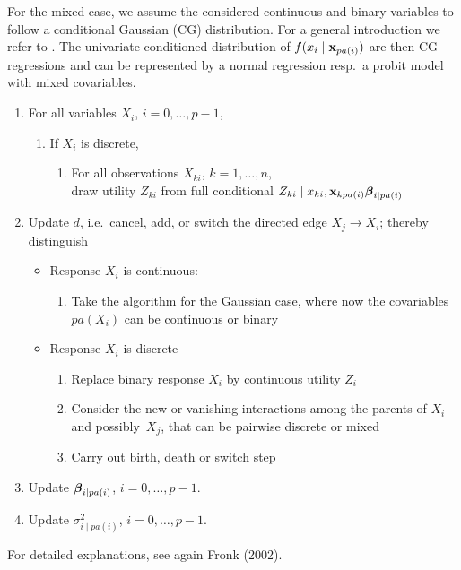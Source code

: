 For the mixed case, we assume the considered continuous and binary
variables to follow a conditional Gaussian (CG) distribution. For
a general introduction we refer to . The
univariate conditioned distribution of $f(x_i \mid \mathbf{x}_{pa(i)})$
are then CG regressions and can
be represented by a normal regression resp.~a probit model with
mixed covariables.
\begin{enumerate}
\item For all variables $X_i$, $i=0, \dots, p-1$,
    \begin{enumerate}
       \item[] If $X_i$ is discrete,
            \begin{enumerate}
            \item[] For all observations $X_{ki}$, $k=1, \dots, n$,  \\
                    draw utility $Z_{ki}$ from full conditional $Z_{ki} \mid x_{ki}, \mathbf{x}_{k pa(i)} \mbox{\boldmath $\beta$}_{i \mid pa(i)}$
            \end{enumerate}
    \end{enumerate}
\item Update $d$, i.e.~cancel, add, or switch the directed edge $X_j \rightarrow X_i$;
      thereby distinguish
    \begin{itemize}
    \item Response $X_i$ is continuous:
    \begin{enumerate}
     \item Take the algorithm for the Gaussian case, where now the covariables
            $pa(X_i)$ can be continuous or binary
     \end{enumerate}
    \item Response $X_i$ is discrete
     \begin{enumerate}
     \item Replace binary response $X_i$ by continuous utility $Z_i$
     \item Consider the new or vanishing interactions among the parents of
     $X_i$ and possibly~$X_j$, that can be pairwise discrete or mixed
     \item Carry out birth, death or switch step
     \end{enumerate}
    \end{itemize}
\item Update $\mbox{\boldmath $\beta$}_{i\mid pa(i)}$, $i=0, \dots, p-1$.
\item Update $\sigma^2_{i\mid pa(i)}$, $i=0, \dots, p-1$.
\end{enumerate}
%
For detailed explanations, see again Fronk (2002).

